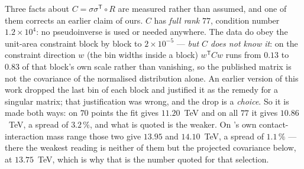 \documentclass[11pt,a4paper]{article}
\begin{document}
\noindent Three facts about $C=\sigma\sigma^{\mathsf T}\!\circ R$ are measured rather than assumed,
and one of them corrects an earlier claim of ours. $C$ has \emph{full rank} $77$, condition number
$1.2\times10^4$: no pseudoinverse is used or needed anywhere. The data do obey the unit-area
constraint block by block to $2\times10^{-5}$ --- \emph{but $C$ does not know it}: on the constraint
direction $w$ (the bin widths inside a block) $w^{\mathsf T}Cw$ runs from $0.13$ to $0.83$ of that
block's own scale rather than vanishing, so the published matrix is not the covariance of the
normalised distribution alone. An earlier version of this work dropped the last bin of each block
and justified it as the remedy for a singular matrix; that justification was wrong, and the drop is
a \emph{choice}. So it is made both ways: on $70$ points the fit gives $11.20$~TeV and on all $77$
it gives $10.86$~TeV, a spread of $3.2\,\%$, and what is quoted is the weaker. On
\cite{CMSangular}'s own contact-interaction mass range those two give $13.95$ and $14.10$~TeV, a
spread of $1.1\,\%$ --- there the weakest reading is neither of them but the projected covariance
below, at $13.75$~TeV, which is why that is the number quoted for that selection.
\end{document}
